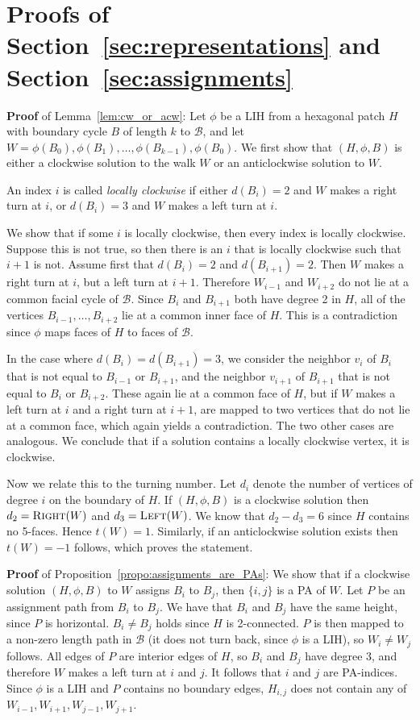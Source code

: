 \documentclass{llncs}
\newcommand{\QED}{\hspace*{\fill}{$\Box$}\medskip}
\newcommand{\BW}{\mathcal{B}}
\newcommand{\convex}{\mbox{\sc Right}}
\newcommand{\concave}{\mbox{\sc Left}}
\begin{document}
\newpage
\appendix

\section{Proofs of Section~\ref{sec:representations} and Section~\ref{sec:assignments}}

{\bf Proof} of Lemma~\ref{lem:cw_or_acw}:
Let $\phi$ be a LIH from a hexagonal patch $H$ with boundary cycle $B$ of length $k$ to $\BW$, and let $W=\phi(B_0),\phi(B_1),\ldots,\phi(B_{k-1}),\phi(B_0)$.
We first show that $(H,\phi,B)$ is either a clockwise solution to the walk $W$ or an anticlockwise solution to $W$.

An index $i$ is called {\em locally clockwise} if either $d(B_i)=2$ and $W$ makes a right turn at $i$, or $d(B_i)=3$ and $W$ makes a left turn at $i$.

We show that if some $i$ is locally clockwise, then every index is locally clockwise. Suppose this is not true, so then there is an $i$ that is locally clockwise such that $i+1$ is not.
Assume first that $d(B_i)=2$ and $d(B_{i+1})=2$. Then $W$ makes a right turn at $i$, but a left turn at $i+1$. Therefore $W_{i-1}$ and $W_{i+2}$ do not lie at a common facial cycle of $\BW$. Since $B_i$ and $B_{i+1}$ both have degree 2 in $H$, all of the vertices $B_{i-1},\ldots,B_{i+2}$ lie at a common inner face of $H$. This is a contradiction since $\phi$ maps faces of $H$ to faces of $\BW$.

In the case where $d(B_i)=d(B_{i+1})=3$, we consider the neighbor $v_i$ of $B_i$ that is not equal to $B_{i-1}$ or $B_{i+1}$, and the neighbor $v_{i+1}$ of $B_{i+1}$ that is not equal to $B_i$ or $B_{i+2}$. These again lie at a common face of $H$, but if $W$ makes a left turn at $i$ and a right turn at $i+1$, are mapped to two vertices that do not lie at a common face, which again yields a contradiction. The two other cases are analogous.
We conclude that if a solution contains a locally clockwise vertex, it is clockwise.

Now we relate this to the turning number.
Let $d_i$ denote the number of vertices of degree $i$ on the boundary of $H$. If $(H,\phi,B)$ is a clockwise solution then $d_2=\convex(W)$ and $d_3=\concave(W)$. 
We know that $d_2-d_3=6$ since $H$ contains no 5-faces. Hence $t(W)=1$. Similarly, if an anticlockwise solution exists then $t(W)=-1$ follows, which proves the statement.\QED



{\bf Proof} of Proposition~\ref{propo:assignments_are_PAs}:
We show that if a clockwise solution $(H,\phi,B)$ to $W$ assigns $B_i$ to $B_j$, then $\{i,j\}$ is a PA of $W$.
Let $P$ be an assignment path from $B_i$ to $B_j$. We have that $B_i$ and $B_j$ have the same height, since $P$ is horizontal. 
$B_i\not=B_j$ holds since $H$ is 2-connected. $P$ is then mapped to a non-zero length path in $\BW$ (it does not turn back, since $\phi$ is a LIH), so $W_i\not=W_j$ follows.
All edges of $P$ are interior edges of $H$, so $B_i$ and $B_j$ have degree 3, and therefore $W$ makes a left turn at $i$ and $j$. It follows that
$i$ and $j$ are PA-indices.
Since $\phi$ is a LIH and $P$ contains no boundary edges, $H_{i,j}$ does not contain any of $W_{i-1},W_{i+1},W_{j-1},W_{j+1}$.
\QED
\end{document}

